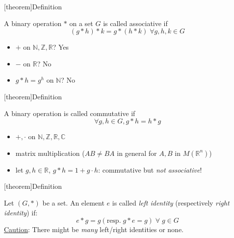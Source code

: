 \documentclass[12pt]{report}
\theoremstyle{definition}
\begin{document}
[theorem]{Definition}
\begin{Associativity}
    A binary operation $*$ on a set $G$ is called associative if\[
        (g*h)*k = g*(h*k) \;\forall g,h,k \in G
    \]
\end{Associativity}

\begin{ex}
    \;

    \begin{itemize}
        \item $+$ on $\mathbb{N}, \mathbb{Z}, \mathbb{R}$? Yes
        \item $-$ on $\mathbb{R}$? No
        \item $g*h = g^{h}$ on $\mathbb{N}$? No
    \end{itemize}
    
\end{ex}

[theorem]{Definition}
\begin{commutative}
    A binary operation is called commutative if \[
        \forall g, h \in G, g * h = h * g
    \]
\end{commutative}

\begin{ex}
    \;

    \begin{itemize}
        \item $+, \cdot$ on $\mathbb{N}, \mathbb{Z}, \mathbb{R}, \mathbb{C}$
        \item matrix multiplication ($AB \neq BA$ in general for $A, B$ in $M(\mathbb{R}^n)$)
        \item let $g, h \in \mathbb{R}$, $g * h = 1 + g \cdot h$: commutative but \emph{not associative}!
    \end{itemize}
    
\end{ex}

[theorem]{Definition}
\begin{identity element}
    Let $(G, *)$ be a set. An element $e$ is called \emph{left identity} (respectively \emph{right identity}) if:\[
        e * g = g (\text{resp.}\; g * e = g) \;\forall\; g \in G
    \]
    \underline{Caution}: There might be \emph{many} left/right identities or none.
\end{identity element}
\end{document}
